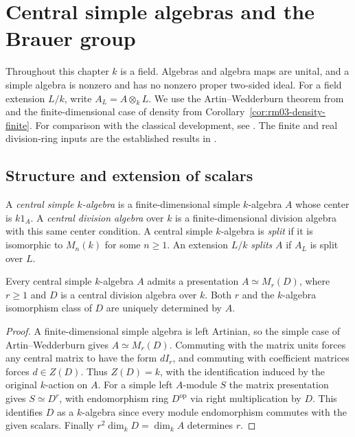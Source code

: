 \chapter{Central simple algebras and the Brauer group}
\label{ch:rm03-central-simple}

Throughout this chapter \(k\) is a field. Algebras and algebra maps are
unital, and a simple algebra is nonzero and has no nonzero proper
two-sided ideal. For a field extension \(L/k\), write \(A_L=A\otimes_k L\).
We use the Artin--Wedderburn theorem from
\cite[ALG-03-C03-R04]{p103} and the finite-dimensional case of density
from Corollary~\ref{cor:rm03-density-finite}. For comparison with the
classical development, see \cite[Sections~11.3--11.8]{stackscsa}.
The finite and real division-ring inputs are the established results in
\cite[K07.23.finite\_division\_ring and K07.23.frobenius]{d07}.

\section{Structure and extension of scalars}

\begin{definition}
\label{def:rm03-csa}
A \emph{central simple \(k\)-algebra} is a finite-dimensional simple
\(k\)-algebra \(A\) whose center is \(k1_A\). A \emph{central division
algebra} over \(k\) is a finite-dimensional division algebra with this
same center condition. A central simple \(k\)-algebra is \emph{split}
if it is isomorphic to \(M_n(k)\) for some \(n\geq 1\). An extension
\(L/k\) \emph{splits} \(A\) if \(A_L\) is split over \(L\).
\end{definition}

\begin{proposition}
\label{prop:rm03-csa-matrix}
Every central simple \(k\)-algebra \(A\) admits a presentation
\(A\simeq M_r(D)\), where \(r\geq 1\) and \(D\) is a central division
algebra over \(k\). Both \(r\) and the \(k\)-algebra isomorphism class
of \(D\) are uniquely determined by \(A\).
\end{proposition}
\begin{proof}
A finite-dimensional simple algebra is left Artinian, so the simple
case of Artin--Wedderburn gives \(A\simeq M_r(D)\). Commuting with
the matrix units forces any central matrix to have the form \(dI_r\),
and commuting with coefficient matrices forces \(d\in Z(D)\).
Thus \(Z(D)=k\), with the identification induced by the original
\(k\)-action on \(A\). For a simple left \(A\)-module \(S\) the matrix
presentation gives \(S\simeq D^r\), with endomorphism ring \(D^{\mathrm{op}}\)
via right multiplication by \(D\). This identifies \(D\) as a
\(k\)-algebra since every module endomorphism commutes with the
given scalars. Finally \(r^2\dim_k D=\dim_k A\) determines \(r\).
\end{proof}

